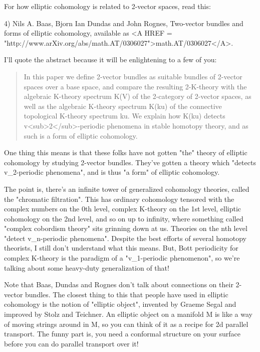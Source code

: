 For how elliptic cohomology is related to 2-vector spaces,
read this:

4) Nils A. Baas, Bjorn Ian Dundas and John Rognes, Two-vector
bundles and forms of elliptic cohomology, available as 
<A HREF = "http://www.arXiv.org/abs/math.AT/0306027">math.AT/0306027</A>.

I'll quote the abstract because it will be enlightening to
a few of you:

\begin{quote}
  In this paper we define 2-vector bundles as suitable bundles of 
  2-vector spaces over a base space, and compare the resulting 
  2-K-theory with the algebraic K-theory spectrum K(V) of the 
  2-category of 2-vector spaces, as well as the algebraic 
  K-theory spectrum K(ku) of the connective topological K-theory 
  spectrum ku. We explain how K(ku) detects v<sub>2</sub>-periodic phenomena 
  in stable homotopy theory, and as such is a form of elliptic cohomology. 
\end{quote}
    
One thing this means is that these folks have not gotten "the" 
theory of elliptic cohomology by studying 2-vector bundles.
They've gotten a theory which "detects v_{2}-periodic 
phenomena",
and is thus "a form" of elliptic cohomology.  

The point is, there's an infinite tower of generalized cohomology
theories, called the "chromatic filtration".  This has ordinary 
cohomology tensored with the complex numbers on the 0th level, 
complex K-theory on the 1st level, elliptic cohomology on the 2nd 
level, and so on up to infinity, where something called "complex 
cobordism theory" sits grinning down at us.  Theories on the nth 
level "detect v_{n}-periodic phenomena".  
Despite the best efforts
of several homotopy theorists, I still don't understand what this
means.  But, Bott periodicity for complex K-theory is the paradigm 
of a "v_{1}-periodic 
phenomenon", so we're talking about some heavy-duty 
generalization of that!  

Note that Baas, Dundas and Rognes don't talk about connections 
on their 2-vector bundles.  The closest thing to this that
people have used in elliptic cohomology is the notion of
"elliptic object", invented by Graeme Segal and improved by
Stolz and Teichner.  An elliptic object on a manifold M is 
like a way of moving strings around in M, so you can think of 
it as a recipe for 2d parallel transport.  The funny part is, 
you need a conformal structure on your surface before you can 
do parallel transport over it!  

